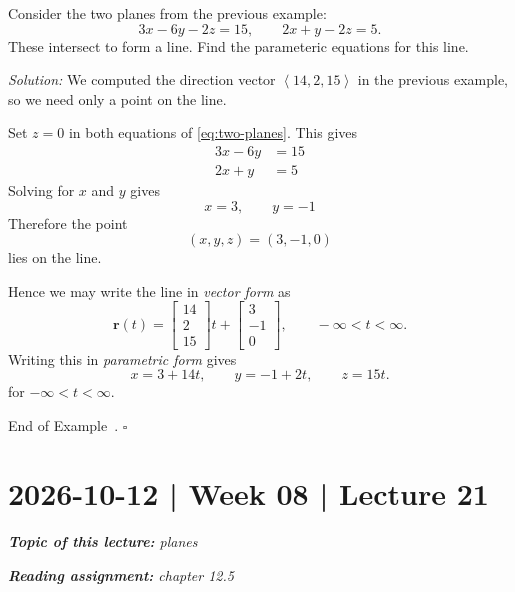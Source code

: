 \documentclass[10pt]{article}
\theoremstyle{definition}
\newtheorem{example}[theorem]{Example}
\renewenvironment{example}
{\begin{oldexample}}
  {\par\smallskip\hfill   End of Example~\theexample. $\square$    \par\end{oldexample}}
\newcommand{\1}[1]{\textbf{1}_{\left[#1\right]}} %
\begin{document}
\begin{example}
  Consider the two planes from the previous example:
  \begin{equation}\label{eq:two-planes}
    3x-6y-2z = 15, \qquad 2x+y-2z=5.
  \end{equation}
  These intersect to form a line. Find the parameteric equations for this
  line.

  \textit{Solution:} We computed the direction vector
  $\left\langle 14,2,15 \right\rangle$ in the previous example, so we need
  only a point on the line.

  Set $z=0$ in both equations of \cref{eq:two-planes}. This gives
  \begin{align*}
    3x-6y &= 15\\
    2x+y &= 5
  \end{align*}
  Solving for $x$ and $y$ gives
  \begin{equation*}
    x = 3, \qquad y = -1
  \end{equation*}
  Therefore the point
  \begin{equation*}
    (x,y,z) = \left( 3, -1, 0 \right) 
  \end{equation*}
  lies on the line.

  Hence we may write the line in \textit{vector form} as
  \begin{equation*}
    \boldsymbol{r}(t) =
    \begin{bmatrix}
      14\\2\\15
    \end{bmatrix}t
    +
    \begin{bmatrix}
      3\\-1\\0
    \end{bmatrix}, \qquad -\infty<t<\infty.
  \end{equation*}
  Writing this in \textit{parametric form} gives
  \begin{equation*}
    x=3+14t, \qquad y = -1+2t, \qquad z=15t.
  \end{equation*}
  for $-\infty<t<\infty$.
\end{example}


\newpage
\section{2026-10-12 | Week 08 | Lecture 21}

\begin{center}
  \begin{tcolorbox}[width=0.9\textwidth, colback=white, colframe=black]
    \textit{\textbf{Topic of this lecture:} planes}

    \textit{\textbf{Reading assignment:} chapter 12.5}
  \end{tcolorbox}
\end{center}
\end{document}
